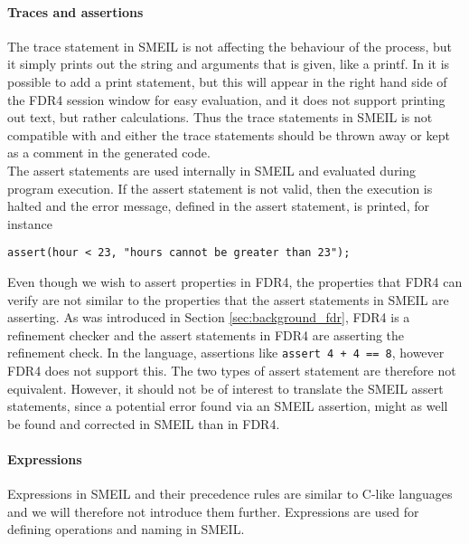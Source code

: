 \paragraph{Traces and assertions}
The trace statement in SMEIL is not affecting the behaviour of the process, but it simply prints out the string and arguments that is given, like a printf.
In \cspm it is possible to add a print statement, but this will appear in the right hand side of the FDR4 session window for easy evaluation, and it does not support printing out text, but rather calculations. Thus the trace statements in SMEIL is not compatible with \cspm and either the trace statements should be thrown away or kept as a comment in the generated code.\\

The assert statements are used internally in SMEIL and evaluated during program execution. If the assert statement is not valid, then the execution is halted and the error message, defined in the assert statement, is printed, for instance
\begin{verbatim}
assert(hour < 23, "hours cannot be greater than 23");
\end{verbatim}

Even though we wish to assert properties in FDR4, the properties that FDR4 can verify are not similar to the properties that the assert statements in SMEIL are asserting. As was introduced in Section \ref{sec:background_fdr}, FDR4 is a refinement checker and the assert statements in FDR4 are asserting the refinement check. In the \cspm language, assertions like \texttt{assert 4 + 4 == 8}, however FDR4 does not support this.
The two types of assert statement are therefore not equivalent. However, it should not be of interest to translate the SMEIL assert statements, since a potential error found via an SMEIL assertion, might as well be found and corrected in SMEIL than in FDR4.

\paragraph{Expressions}
Expressions in SMEIL and their precedence rules are similar to C-like languages and we will therefore not introduce them further. Expressions are used for defining operations and naming in SMEIL.

